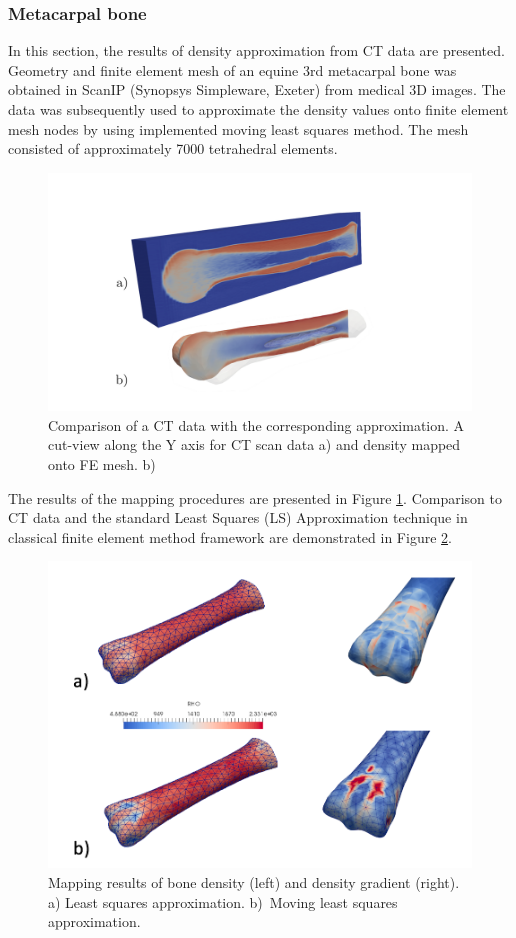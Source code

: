 \documentclass[11pt]{acmeArticle}
\numberwithin{equation}{section}
\begin{document}
\subsubsection{Metacarpal bone}
In this section, the results of density approximation from CT data are presented. Geometry and finite element mesh of an equine 3rd metacarpal bone was obtained in ScanIP (Synopsys Simpleware, Exeter) from medical 3D images. The data was subsequently used to approximate the density values onto finite element mesh nodes by using implemented moving least squares method. The mesh consisted of approximately 7000 tetrahedral elements. \\
\begin{figure}
	\centering
	\includegraphics[width=0.5\linewidth]{Figures/mwlsmapping_cross.pdf}
	\caption{Comparison of a CT data with the corresponding approximation. A cut-view along the Y axis for CT scan data a) and density mapped onto FE mesh. b)}
	\label{fig:mwlsmapping_cross}
\end{figure}
The results of the mapping procedures are presented in Figure \ref{fig:mwlsmapping_cross}. Comparison to CT data and the standard Least Squares (LS) Approximation technique in classical finite element method framework are demonstrated in Figure \ref{fig:mwlsmappingcomparisons}.
\begin{figure}
	\centering
	\includegraphics[width=0.7\linewidth]{Figures/mwls_mapping_comparisons.png}
	\caption{Mapping results of bone density (left) and density gradient (right). a) Least squares approximation. b)~Moving least squares approximation.}
	\label{fig:mwlsmappingcomparisons}
\end{figure}
\end{document}
